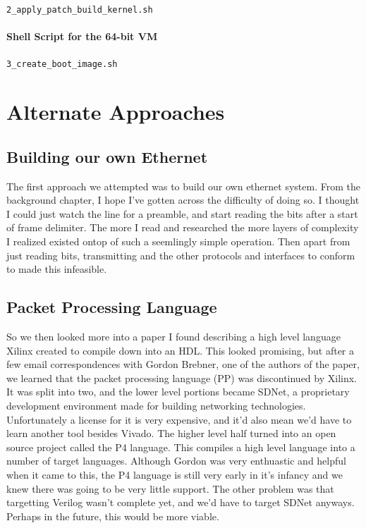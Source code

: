 \documentclass[12pt]{report}
\begin{document}
\texttt{2\_apply\_patch\_build\_kernel.sh}


\subsubsection{Shell Script for the 64-bit VM}
\texttt{3\_create\_boot\_image.sh}


\chapter{Alternate Approaches}
\section{Building our own Ethernet}
The first approach we attempted was to build our own ethernet system. From the background chapter, I hope I've gotten across the difficulty of doing so. I thought I could just watch the line for a preamble, and start reading the bits after a start of frame delimiter. The more I read and researched the more layers of complexity I realized existed ontop of such a seemlingly simple operation. Then apart from just reading bits, transmitting and the other protocols and interfaces to conform to made this infeasible.

\section{Packet Processing Language}
So we then looked more into a paper \cite{pp} I found describing a high level language Xilinx created to compile down into an HDL. This looked promising, but after a few email correspondences with Gordon Brebner, one of the authors of the paper, we learned that the packet processing language (PP) was discontinued by Xilinx. It was split into two, and the lower level portions became SDNet, a proprietary development environment made for building networking technologies. Unfortunately a license for it is very expensive, and it'd also mean we'd have to learn another tool besides Vivado.
The higher level half turned into an open source project called the P4 language.
This compiles a high level language into a number of target languages. Although Gordon was very enthuastic and helpful when it came to this, the P4 language is still very early in it's infancy and we knew there was going to be very little support. The other problem was that targetting Verilog wasn't complete yet, and we'd have to target SDNet anyways. Perhaps in the future, this would be more viable.
\end{document}

